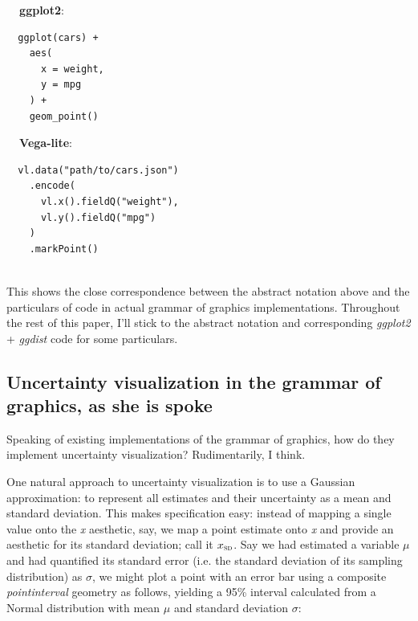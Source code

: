 \documentclass[journal]{vgtc}                     %
\begin{document}
\vspace{5pt}
\noindent
\begin{minipage}{.4\columnwidth}%
\textbf{~~ggplot2}:

\small
\vspace{-8pt}
\begin{verbatim}
  ggplot(cars) +
    aes(
      x = weight,
      y = mpg
    ) +
    geom_point()
\end{verbatim}%
\end{minipage}%
\begin{minipage}{.5\columnwidth}%
\textbf{~~Vega-lite}:

\small
\vspace{-8pt}
\begin{verbatim}
  vl.data("path/to/cars.json")
    .encode(
      vl.x().fieldQ("weight"),
      vl.y().fieldQ("mpg")
    )
    .markPoint()
\end{verbatim}%
\end{minipage}%
\vspace{.6\belowdisplayskip}\\
This shows the close correspondence between the abstract notation above and the particulars of code in actual grammar of graphics implementations. Throughout the rest of this paper, I'll stick to the abstract notation and corresponding \textit{ggplot2} + \textit{ggdist} code for some particulars.

\subsection{Uncertainty visualization in the grammar of graphics, as she is spoke}

Speaking of existing implementations of the grammar of graphics, how do they implement uncertainty visualization? Rudimentarily, I think.

One natural approach to uncertainty visualization is to use a Gaussian approximation: to represent all estimates and their uncertainty as a mean and standard deviation. This makes specification easy: instead of mapping a single value onto the \textit{x} aesthetic, say, we map a point estimate onto \textit{x} and provide an aesthetic for its standard deviation; call it $x_\textsc{sd}$. Say we had estimated a variable $\mu$ and had quantified its standard error (i.e. the standard deviation of its sampling distribution) as $\sigma$, we might plot a point with an error bar using a composite \textit{pointinterval} geometry as follows, yielding a 95\% interval calculated from a Normal distribution with mean $\mu$ and standard deviation $\sigma$:
\end{document}
